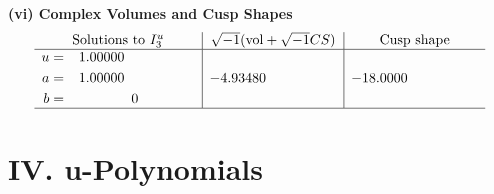 \documentclass[1p]{elsarticle_modified}
\theoremstyle{definition}
\newcommand{\I}{\sqrt{-1}}
\begin{document}
\newpage\flushleft \textbf{(vi) Complex Volumes and Cusp Shapes}
$$\begin{array}{c|c|c}  
\text{Solutions to }I^u_{3}& \I (\text{vol} + \sqrt{-1}CS) & \text{Cusp shape}\\
 \hline 
\begin{aligned}
u &= \phantom{-}1.00000\phantom{ +0.000000I} \\
a &= \phantom{-}1.00000\phantom{ +0.000000I} \\
b &= \phantom{-0.000000 } 0\end{aligned}
 & -4.93480\phantom{ +0.000000I} & -18.0000\phantom{ +0.000000I}\\
 \hline 
 \end{array}$$\newpage
\newpage\renewcommand{\arraystretch}{1}
\centering \section*{ IV. u-Polynomials}
\end{document}
